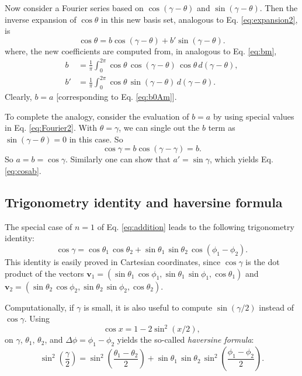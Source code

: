 \documentclass[11pt]{article}
\newcommand{\vct}[1]{\boldsymbol{\mathbf{#1}}}
\begin{document}
Now consider a Fourier series based on $\cos(\gamma - \theta)$
and $\sin(\gamma - \theta)$.
Then the inverse expansion of $\cos\theta$
in this new basis set, analogous to Eq. \eqref{eq:expansion2}, is
\begin{equation}
  \cos\theta
  =
  b \cos(\gamma - \theta)
+
  b' \sin(\gamma - \theta).
  \label{eq:Fourier2}
\end{equation}
where,
the new coefficients are computed from,
in analogous to Eq. \eqref{eq:bm},
\begin{align}
b &= \frac{1}{\pi} \int_0^{2\pi}
  \cos\theta \, \cos(\gamma - \theta) \, \cos\theta \, d(\gamma - \theta),
  \label{eq:c2}
\\
b' &= \frac{1}{\pi} \int_0^{2\pi}
  \cos\theta \, \sin(\gamma - \theta) \, d(\gamma - \theta).
  \label{eq:s2}
\end{align}
Clearly, $b = a$ [corresponding to Eq. \eqref{eq:b0Am}].

To complete the analogy,
consider the evaluation of $b = a$
by using special values in
Eq. \eqref{eq:Fourier2}.
%
With $\theta = \gamma$,
we can single out the $b$ term
as $\sin(\gamma - \theta) = 0$
in this case.
%
So
\begin{equation}
  \cos\gamma
=
  b \cos(\gamma - \gamma)
= b.
\end{equation}
So $a = b = \cos\gamma$.
%
Similarly one can show that $a' = \sin\gamma$,
which yields Eq. \eqref{eq:cosab}.



\subsection{Trigonometry identity and haversine formula}



The special case of $n = 1$ of Eq. \eqref{eq:addition}
leads to the following trigonometry identity:
%
\begin{equation}
  \cos\gamma
=
  \cos\theta_1 \, \cos\theta_2
+
  \sin\theta_1 \, \sin\theta_2 \, \cos(\phi_1 - \phi_2).
  \label{eq:triggamma}
\end{equation}
%
This identity is easily proved in Cartesian coordinates,
since $\cos\gamma$ is the dot product of the vectors
$\vct v_1 = (\sin\theta_1 \, \cos\phi_1, \sin\theta_1 \, \sin\phi_1, \cos\theta_1)$
and
$\vct v_2 = (\sin\theta_2 \, \cos\phi_2, \sin\theta_2 \, \sin\phi_2, \cos\theta_2)$.

Computationally, if $\gamma$ is small,
it is also useful to compute $\sin(\gamma/2)$ instead of $\cos\gamma$.
Using
\[
  \cos x = 1 - 2 \sin^2(x/2),
\]
on $\gamma$, $\theta_1$, $\theta_2$, and $\Delta \phi = \phi_1 - \phi_2$ yields
the so-called \emph{haversine formula}:
\[
  \sin^2 \left( \frac{\gamma}{2} \right)
=
  \sin^2 \left( \frac{\theta_1 - \theta_2}{2} \right)
+
  \sin\theta_1 \, \sin\theta_2 \,
  \sin^2 \left( \frac{\phi_1 - \phi_2}{2} \right).
\]
\end{document}

